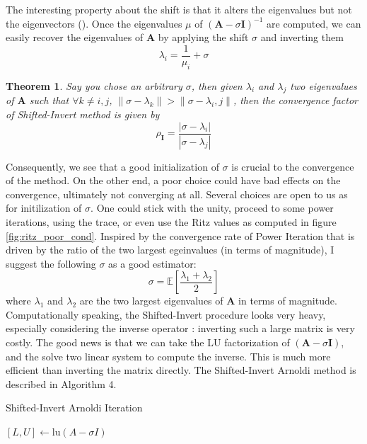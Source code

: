 \documentclass[11pt]{article}
\newtheorem{theorem}{Theorem}
\numberwithin{equation}{section}
\begin{document}
The interesting property about the shift is that it alters the eigenvalues but not the eigenvectors (\cite{saad2011numerical}). Once the eigenvalues $\mu$ of $(\mathbf{A}-\sigma\mathbf{I})^{-1}$ are computed, we can easily recover the eigenvalues of $\mathbf{A}$ by applying the shift $\sigma$ and inverting them
\begin{equation*}
    \lambda_i = \frac{1}{\mu_i} + \sigma
\end{equation*}
\begin{theorem}
    Say you chose an arbitrary $\sigma$, then given $\lambda_i$ and $\lambda_j$ two eigenvalues of $\mathbf{A}$ such that $\forall k \neq i,j$, $\|\sigma-\lambda_k\| > \|\sigma-\lambda_i,j\|$, then the convergence factor of Shifted-Invert method is given by 
    \begin{equation}
        \rho_{\mathbf{I}} = \frac{|\sigma-\lambda_i|}{|\sigma-\lambda_j|}
    \end{equation}
\end{theorem}
Consequently, we see that a good initialization of $\sigma$ is crucial to the convergence of the method. On the other end, a poor choice could have bad effects on the convergence, ultimately not converging at all. Several choices are open to us as for initilization of $\sigma$. One could stick with the unity, proceed to some power iterations, using the trace, or even use the Ritz values as computed in figure \ref{fig:ritz_poor_cond}. Inspired by the convergence rate of Power Iteration that is driven by the ratio of the two largest egeinvalues (in terms of magnitude), I suggest the following $\sigma$ as a good estimator:
\begin{equation}
    \sigma = \mathbb{E}\left[\frac{\lambda_1+\lambda_2}{2}\right]
\end{equation}
where $\lambda_1$ and $\lambda_2$ are the two largest eigenvalues of $\mathbf{A}$ in terms of magnitude. Computationally speaking, the Shifted-Invert procedure looks very heavy, especially considering the inverse operator : inverting such a large matrix is very costly. The good news is that we can take the LU factorization of $(\mathbf{A}-\sigma\mathbf{I})$, and the solve two linear system to compute the inverse. This is much more efficient than inverting the matrix directly. The Shifted-Invert Arnoldi method is described in Algorithm 4.
\begin{algorithm2e}
    \SetAlgoLined
    \caption{Shifted-Invert Arnoldi Iteration}
    $[L,U] \gets \text{lu}(A-\sigma I)$\;
\end{algorithm2e}
\end{document}
